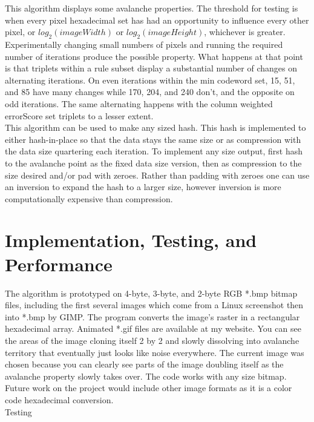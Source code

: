 \documentclass[11pt]{article}
\begin{document}
This algorithm displays some avalanche properties. The threshold for testing is when every pixel hexadecimal set has had an opportunity to influence every other pixel, or $log_2(imageWidth)$ or $log_2(imageHeight)$, whichever is greater. Experimentally changing small numbers of pixels and running the required number of iterations produce the possible property. What happens at that point is that triplets within a rule subset display a substantial number of changes on alternating iterations. On even iterations within the min codeword set, 15, 51, and 85 have many changes while 170, 204, and 240 don't, and the opposite on odd iterations. The same alternating happens with the column weighted errorScore set triplets to a lesser extent.\\

This algorithm can be used to make any sized hash. This hash is implemented to either hash-in-place so that the data stays the same size or as compression with the data size quartering each iteration. To implement any size output, first hash to the avalanche point as the fixed data size version, then as compression to the size desired and/or pad with zeroes. Rather than padding with zeroes one can use an inversion to expand the hash to a larger size, however inversion is more computationally expensive than compression.\\

\section{Implementation, Testing, and Performance}

The algorithm is prototyped on 4-byte, 3-byte, and 2-byte RGB *.bmp bitmap files, including the first several images which come from a Linux screenshot then into *.bmp by GIMP. The program converts the image's raster in a rectangular hexadecimal array. Animated *.gif files are available at my website. You can see the areas of the image cloning itself 2 by 2 and slowly dissolving into avalanche territory that eventually just looks like noise everywhere. The current image was chosen because you can clearly see parts of the image doubling itself as the avalanche property slowly takes over. The code works with any size bitmap. Future work on the project would include other image formats as it is a color code hexadecimal conversion. \\

Testing\\
\end{document}
